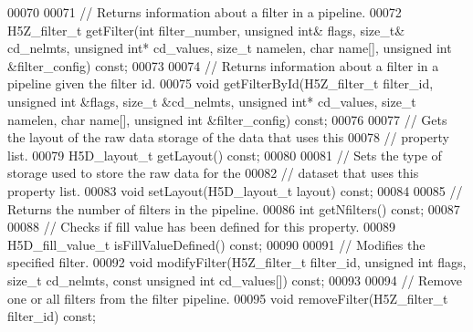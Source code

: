 \begin{DoxyCode}
00070 
00071         \textcolor{comment}{// Returns information about a filter in a pipeline.}
00072         H5Z\_filter\_t getFilter(\textcolor{keywordtype}{int} filter\_number, \textcolor{keywordtype}{unsigned} \textcolor{keywordtype}{int}& flags, \textcolor{keywordtype}{size\_t}& cd\_nelmts, \textcolor{keywordtype}{unsigned} \textcolor{keywordtype}{int}* 
      cd\_values, \textcolor{keywordtype}{size\_t} namelen, \textcolor{keywordtype}{char} name[], \textcolor{keywordtype}{unsigned} \textcolor{keywordtype}{int} &filter\_config) \textcolor{keyword}{const};
00073 
00074         \textcolor{comment}{// Returns information about a filter in a pipeline given the filter id.}
00075         \textcolor{keywordtype}{void} getFilterById(H5Z\_filter\_t filter\_id, \textcolor{keywordtype}{unsigned} \textcolor{keywordtype}{int} &flags, \textcolor{keywordtype}{size\_t} &cd\_nelmts, \textcolor{keywordtype}{unsigned} \textcolor{keywordtype}{int}* 
      cd\_values, \textcolor{keywordtype}{size\_t} namelen, \textcolor{keywordtype}{char} name[], \textcolor{keywordtype}{unsigned} \textcolor{keywordtype}{int} &filter\_config) \textcolor{keyword}{const};
00076 
00077         \textcolor{comment}{// Gets the layout of the raw data storage of the data that uses this}
00078         \textcolor{comment}{// property list.}
00079         H5D\_layout\_t getLayout() \textcolor{keyword}{const};
00080 
00081         \textcolor{comment}{// Sets the type of storage used to store the raw data for the}
00082         \textcolor{comment}{// dataset that uses this property list.}
00083         \textcolor{keywordtype}{void} setLayout(H5D\_layout\_t layout) \textcolor{keyword}{const};
00084 
00085         \textcolor{comment}{// Returns the number of filters in the pipeline.}
00086         \textcolor{keywordtype}{int} getNfilters() \textcolor{keyword}{const};
00087 
00088         \textcolor{comment}{// Checks if fill value has been defined for this property.}
00089         H5D\_fill\_value\_t isFillValueDefined() \textcolor{keyword}{const};
00090 
00091         \textcolor{comment}{// Modifies the specified filter.}
00092         \textcolor{keywordtype}{void} modifyFilter(H5Z\_filter\_t filter\_id, \textcolor{keywordtype}{unsigned} \textcolor{keywordtype}{int} flags, \textcolor{keywordtype}{size\_t} cd\_nelmts, \textcolor{keyword}{const} \textcolor{keywordtype}{unsigned} \textcolor{keywordtype}{int} 
      cd\_values[]) \textcolor{keyword}{const};
00093 
00094         \textcolor{comment}{// Remove one or all filters from the filter pipeline.}
00095         \textcolor{keywordtype}{void} removeFilter(H5Z\_filter\_t filter\_id) \textcolor{keyword}{const};

\end{DoxyCode}
